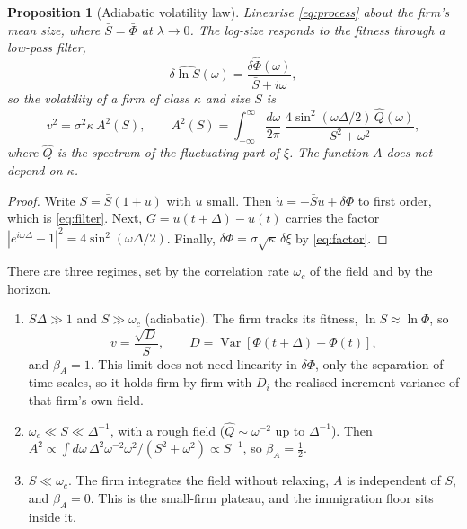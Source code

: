 \documentclass[11pt]{article}
\newcommand{\Var}{\operatorname{Var}}
\newtheorem{proposition}{Proposition}
\theoremstyle{remark}
\begin{document}
\begin{proposition}[Adiabatic volatility law]\label{prop:adiabatic}
Linearise \eqref{eq:process} about the firm's mean size, where $\bar S=\bar\Phi$ at
$\lambda\to0$.  The log-size responds to the fitness through a low-pass filter,
\begin{equation}
  \delta\widehat{\ln S}(\omega)=\frac{\delta\widehat\Phi(\omega)}{\bar S+i\omega},
  \label{eq:filter}
\end{equation}
so the volatility of a firm of class $\kappa$ and size $S$ is
\begin{equation}
  v^2=\sigma^2\kappa\,A^2(S),
  \qquad
  A^2(S)=\int_{-\infty}^{\infty}\frac{d\omega}{2\pi}\;
     \frac{4\sin^2(\omega\Delta/2)\,\widehat Q(\omega)}{S^2+\omega^2},
  \label{eq:A}
\end{equation}
where $\widehat Q$ is the spectrum of the fluctuating part of $\xi$.  The function $A$ does not
depend on $\kappa$.
\end{proposition}

\begin{proof}
Write $S=\bar S(1+u)$ with $u$ small.  Then $\dot u=-\bar S u+\delta\Phi$ to first order, which
is \eqref{eq:filter}.  Next, $G=u(t+\Delta)-u(t)$ carries the factor $|e^{i\omega\Delta}-1|^2=
4\sin^2(\omega\Delta/2)$.  Finally, $\delta\Phi=\sigma\sqrt\kappa\,\delta\xi$ by
\eqref{eq:factor}.
\end{proof}

There are three regimes, set by the correlation rate $\omega_c$ of the field and by the horizon.
\begin{enumerate}
  \item $S\Delta\gg1$ and $S\gg\omega_c$ (adiabatic). The firm tracks its fitness,
        $\ln S\approx\ln\Phi$, so
        \begin{equation}
          v=\frac{\sqrt{D}}{S},\qquad D=\Var[\Phi(t+\Delta)-\Phi(t)],
          \label{eq:adiabatic}
        \end{equation}
        and $\beta_A=1$.  This limit does not need linearity in $\delta\Phi$, only the
        separation of time scales, so it holds firm by firm with $D_i$ the realised increment
        variance of that firm's own field.
  \item $\omega_c\ll S\ll\Delta^{-1}$, with a rough field ($\widehat Q\sim\omega^{-2}$ up to
        $\Delta^{-1}$).  Then $A^2\propto\int d\omega\,\Delta^2\omega^{-2}\omega^2/(S^2+
        \omega^2)\propto S^{-1}$, so $\beta_A=\tfrac12$.
  \item $S\ll\omega_c$.  The firm integrates the field without relaxing, $A$ is
        independent of $S$, and $\beta_A=0$.  This is the small-firm plateau, and the
        immigration floor sits inside it.
\end{enumerate}
\end{document}

